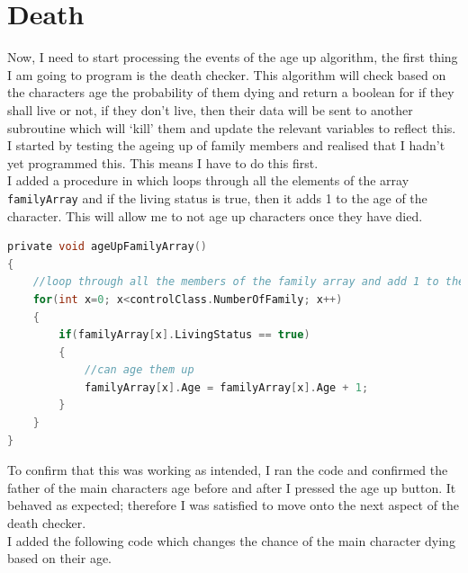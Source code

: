 \section{Death}
Now, I need to start processing the events of the age up algorithm, the first thing I am going to program is the death checker. This algorithm will check based on the character\textquotesingle s age the probability of them dying and return a boolean for if they shall live or not, if they don't live, then their data will be sent to another subroutine which will ‘kill' them and update the relevant variables to reflect this. I started by testing the ageing up of family members and realised that I hadn't yet programmed this. This means I have to do this first.\\
I added a procedure in which loops through all the elements of the array \verb|familyArray| and if the living status is true, then it adds 1 to the age of the character. This will allow me to not age up characters once they have died.
\begin{lstlisting}[language=c, style=csharp, caption=Method which increases the age of the family array]
private void ageUpFamilyArray()
{
    //loop through all the members of the family array and add 1 to their age if livingstatus is true
    for(int x=0; x<controlClass.NumberOfFamily; x++)
    {
        if(familyArray[x].LivingStatus == true)
        {
            //can age them up
            familyArray[x].Age = familyArray[x].Age + 1;
        }
    }
}
\end{lstlisting}
To confirm that this was working as intended, I ran the code and confirmed the father of the main characters age before and after I pressed the age up button. It behaved as expected; therefore I was satisfied to move onto the next aspect of the death checker.\\
I added the following code which changes the chance of the main character dying based on their age.
